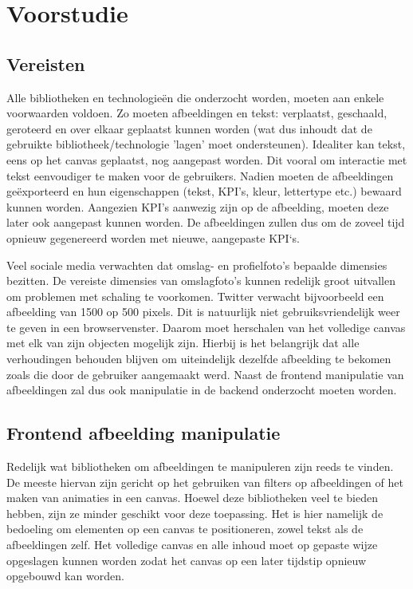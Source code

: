 
\chapter{Voorstudie}
\vspace{-3cm}
\section{Vereisten} \label{vereisten}
Alle bibliotheken en technologie\"{e}n die onderzocht worden, moeten aan enkele voorwaarden voldoen. Zo moeten afbeeldingen en tekst: verplaatst, geschaald, geroteerd en over elkaar geplaatst kunnen worden (wat dus inhoudt dat de gebruikte bibliotheek/technologie 'lagen' moet ondersteunen). Idealiter kan tekst, eens op het canvas geplaatst, nog aangepast worden. Dit vooral om interactie met tekst eenvoudiger te maken voor de gebruikers. Nadien moeten de afbeeldingen ge\"{e}xporteerd en hun eigenschappen (tekst, KPI's, kleur, lettertype etc.) bewaard kunnen worden. Aangezien KPI's aanwezig zijn op de afbeelding, moeten deze later ook aangepast kunnen worden. De afbeeldingen zullen dus om de zoveel tijd opnieuw gegenereerd worden met nieuwe, aangepaste KPI`s. 

Veel sociale media verwachten dat omslag- en profielfoto's bepaalde dimensies bezitten. De vereiste dimensies van omslagfoto's kunnen redelijk groot uitvallen om problemen met schaling te voorkomen. Twitter verwacht bijvoorbeeld een afbeelding van 1500 op 500 pixels. Dit is natuurlijk niet gebruiksvriendelijk weer te geven in een browservenster. Daarom moet herschalen van het volledige canvas met elk van zijn objecten mogelijk zijn. Hierbij is het belangrijk dat alle verhoudingen behouden blijven om uiteindelijk dezelfde afbeelding te bekomen zoals die door de gebruiker aangemaakt werd. Naast de frontend manipulatie van afbeeldingen zal dus ook manipulatie in de backend onderzocht moeten worden.  

\section{Frontend afbeelding manipulatie}
Redelijk wat bibliotheken om afbeeldingen te manipuleren zijn reeds te vinden. De meeste hiervan zijn gericht op het gebruiken van filters op afbeeldingen of het maken van animaties in een canvas. Hoewel deze bibliotheken veel te bieden hebben, zijn ze minder geschikt voor deze toepassing. Het is hier namelijk de bedoeling om elementen op een canvas te positioneren, zowel tekst als de afbeeldingen zelf. Het volledige canvas en alle inhoud moet op gepaste wijze opgeslagen kunnen worden zodat het canvas op een later tijdstip opnieuw opgebouwd kan worden. 

